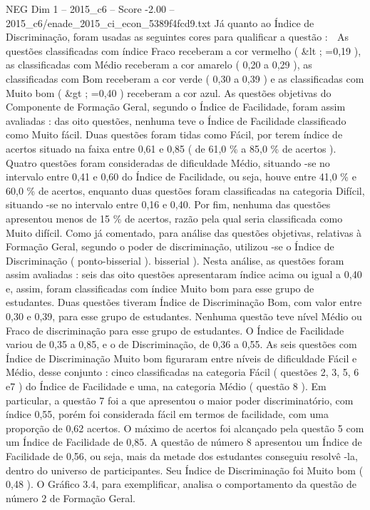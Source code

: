 \begin{textsample}{NEG Dim 1 – 2015\_c6 – Score -2.00 – 2015\_c6/enade\_2015\_ci\_econ\_5389f4fcd9.txt}
Já quanto ao Índice de Discriminação, foram usadas as seguintes cores para qualificar a questão :  As questões classificadas com índice Fraco receberam a cor vermelho ( \&lt ; =0,19 ), as classificadas com Médio receberam a cor amarelo ( 0,20 a 0,29 ), as classificadas com Bom receberam a cor verde ( 0,30 a 0,39 ) e as classificadas com Muito bom ( \&gt ; =0,40 ) receberam a cor azul.
As questões objetivas do Componente de Formação Geral, segundo o Índice de Facilidade, foram assim avaliadas : das oito questões, nenhuma teve o Índice de Facilidade classificado como Muito fácil.
Duas questões foram tidas como Fácil, por terem índice de acertos situado na faixa entre 0,61 e 0,85 ( de 61,0 \% a 85,0 \% de acertos ).
Quatro questões foram consideradas de dificuldade Médio, situando -se no intervalo entre 0,41 e 0,60 do Índice de Facilidade, ou seja, houve entre 41,0 \% e 60,0 \% de acertos, enquanto duas questões foram classificadas na categoria Difícil, situando -se no intervalo entre 0,16 e 0,40.
Por fim, nenhuma das questões apresentou menos de 15 \% de acertos, razão pela qual seria classificada como Muito difícil.
Como já comentado, para análise das questões objetivas, relativas à Formação Geral, segundo o poder de discriminação, utilizou -se o Índice de Discriminação ( ponto-bisserial ). bisserial ).
Nesta análise, as questões foram assim avaliadas : seis das oito questões apresentaram índice acima ou igual a 0,40 e, assim, foram classificadas com índice Muito bom para esse grupo de estudantes.
Duas questões tiveram Índice de Discriminação Bom, com valor entre 0,30 e 0,39, para esse grupo de estudantes.
Nenhuma questão teve nível Médio ou Fraco de discriminação para esse grupo de estudantes.
O Índice de Facilidade variou de 0,35 a 0,85, e o de Discriminação, de 0,36 a 0,55.
As seis questões com Índice de Discriminação Muito bom figuraram entre níveis de dificuldade Fácil e Médio, desse conjunto : cinco classificadas na categoria Fácil ( questões 2, 3, 5, 6 e7 ) do Índice de Facilidade e uma, na categoria Médio ( questão 8 ).
Em particular, a questão 7 foi a que apresentou o maior poder discriminatório, com índice 0,55, porém foi considerada fácil em termos de facilidade, com uma proporção de 0,62 acertos.
O máximo de acertos foi alcançado pela questão 5 com um Índice de Facilidade de 0,85.
A questão de número 8 apresentou um Índice de Facilidade de 0,56, ou seja, mais da metade dos estudantes conseguiu resolvê -la, dentro do universo de participantes.
Seu Índice de Discriminação foi Muito bom ( 0,48 ).
O Gráfico 3.4, para exemplificar, analisa o comportamento da questão de número 2 de Formação Geral.

\end{textsample}
